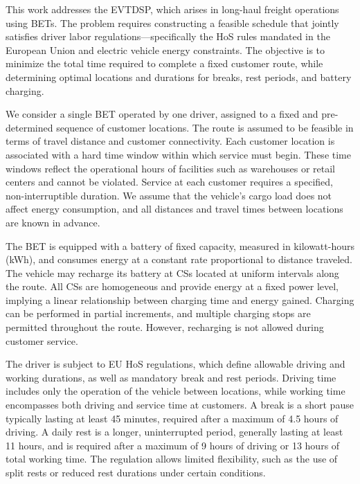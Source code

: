 \documentclass[trsc,dblanonrev]{informs4}
\begin{document}
This work addresses the EVTDSP, which arises in long-haul freight operations using BETs. The problem requires constructing a feasible schedule that jointly satisfies driver labor regulations—specifically the HoS rules mandated in the European Union and electric vehicle energy constraints. The objective is to minimize the total time required to complete a fixed customer route, while determining optimal locations and durations for breaks, rest periods, and battery charging.

We consider a single BET operated by one driver, assigned to a fixed and pre-determined sequence of customer locations. The route is assumed to be feasible in terms of travel distance and customer connectivity. Each customer location is associated with a hard time window within which service must begin. These time windows reflect the operational hours of facilities such as warehouses or retail centers and cannot be violated. Service at each customer requires a specified, non-interruptible duration. We assume that the vehicle's cargo load does not affect energy consumption, and all distances and travel times between locations are known in advance.

The BET is equipped with a battery of fixed capacity, measured in kilowatt-hours (kWh), and consumes energy at a constant rate proportional to distance traveled. The vehicle may recharge its battery at CSs located at uniform intervals along the route. All CSs are homogeneous and provide energy at a fixed power level, implying a linear relationship between charging time and energy gained. Charging can be performed in partial increments, and multiple charging stops are permitted throughout the route. However, recharging is not allowed during customer service.

The driver is subject to EU HoS regulations, which define allowable driving and working durations, as well as mandatory break and rest periods. Driving time includes only the operation of the vehicle between locations, while working time encompasses both driving and service time at customers. A break is a short pause typically lasting at least 45 minutes, required after a maximum of 4.5 hours of driving. A daily rest is a longer, uninterrupted period, generally lasting at least 11 hours, and is required after a maximum of 9 hours of driving or 13 hours of total working time. The regulation allows limited flexibility, such as the use of split rests or reduced rest durations under certain conditions.
\end{document}
